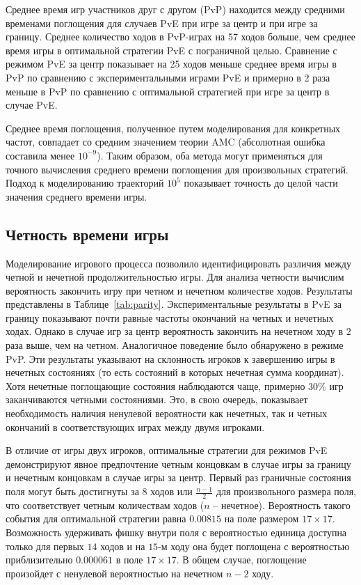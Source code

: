 Среднее время игр участников друг с другом (PvP) находится между средними временами поглощения для случаев PvE при игре за центр и при игре за границу. Среднее количество ходов в PvP-играх на 57 ходов больше, чем среднее время игры в оптимальной стратегии PvE с пограничной целью. Сравнение с режимом PvE за центр показывает на 25 ходов меньше среднее время игры в PvP по сравнению с экспериментальными играми PvE и примерно в 2 раза меньше в PvP по сравнению с оптимальной стратегией при игре за центр в случае PvE.

Среднее время поглощения, полученное путем моделирования для конкретных частот, совпадает со средним значением теории AMC (абсолютная ошибка составила менее $10^{-9}$). Таким образом, оба метода могут применяться для точного вычисления среднего времени поглощения для произвольных стратегий. Подход к моделированию траекторий $10^5$ показывает точность до целой части значения среднего времени игры.

\subsection{Четность времени игры}\label{subsec:ch3/sec4/sub2}

Моделирование игрового процесса позволило идентифицировать различия между четной и нечетной продолжительностью игры. Для анализа четности вычислим вероятность закончить игру при четном и нечетном количестве ходов. Результаты представлены в Таблице~\cref{tab:parity}. Экспериментальные результаты в PvE за границу показывают почти равные частоты окончаний на четных и нечетных ходах. Однако в случае игр за центр вероятность закончить на нечетном ходу в $2$ раза выше, чем на четном. Аналогичное поведение было обнаружено в режиме PvP. Эти результаты указывают на склонность игроков к завершению игры в нечетных состояниях (то есть состояний в которых нечетная сумма координат). Хотя нечетные поглощающие состояния наблюдаются чаще, примерно $30\%$ игр заканчиваются четными состояниями. Это, в свою очередь, показывает необходимость наличия ненулевой вероятности как нечетных, так и четных окончаний в соответствующих играх между двумя игроками.

В отличие от игры двух игроков, оптимальные стратегии для режимов PvE демонстрируют явное предпочтение четным концовкам в случае игры за границу и нечетным концовкам в случае игры за центр. Первый раз граничные состояния поля могут быть достигнуты за $8$ ходов или $\frac{n-1}{2}$ для произвольного размера поля, что соответствует четным количествам ходов ($n$ -- нечетное). Вероятность такого события для оптимальной стратегии равна $0.00815$ на поле размером $17 \times 17$. Возможность удерживать фишку внутри поля с вероятностью единица доступна только для первых $14$ ходов и на $15$-м ходу она будет поглощена с вероятностью приблизительно $0.000061$ в поле $17 \times 17$. В общем случае, поглощение произойдет с ненулевой вероятностью на нечетном $n-2$ ходу.

